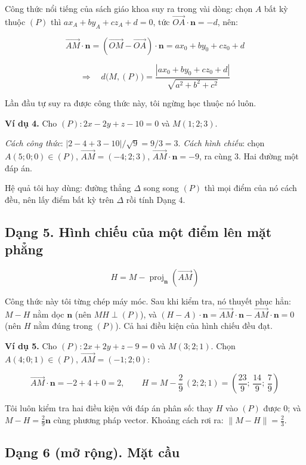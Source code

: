 \documentclass[12pt,a4paper]{article}
\begin{document}
Công thức nổi tiếng của sách giáo khoa suy ra trong vài dòng: chọn $A$ bất kỳ thuộc $(P)$ thì $ax_A+by_A+cz_A+d=0$, tức $\overrightarrow{OA}\cdot\mathbf{n}=-d$, nên:

$$
\overrightarrow{AM}\cdot\mathbf{n}
= (\overrightarrow{OM}-\overrightarrow{OA})\cdot\mathbf{n}
= ax_0+by_0+cz_0+d
$$

$$
\Longrightarrow\quad
d\bigl(M,(P)\bigr) = \frac{|ax_0 + by_0 + cz_0 + d|}{\sqrt{a^2+b^2+c^2}}
$$

Lần đầu tự suy ra được công thức này, tôi ngừng học thuộc nó luôn.

\textbf{Ví dụ 4.} Cho $(P): 2x-2y+z-10=0$ và $M(1;2;3)$.

\emph{Cách công thức}: $|2-4+3-10|/\sqrt{9} = 9/3 = 3$. \emph{Cách hình chiếu}: chọn $A(5;0;0)\in(P)$, $\overrightarrow{AM}=(-4;2;3)$, $\overrightarrow{AM}\cdot\mathbf{n} = -9$, ra cùng $3$. Hai đường một đáp án.

Hệ quả tôi hay dùng: đường thẳng $\Delta$ song song $(P)$ thì mọi điểm của nó cách đều, nên lấy điểm bất kỳ trên $\Delta$ rồi tính Dạng 4.

\subsection*{Dạng 5. Hình chiếu của một điểm lên mặt phẳng}

$$
\boxed{\;H = M - \operatorname{proj}_{\mathbf{n}}(\overrightarrow{AM})\;}
$$

Công thức này tôi từng chép máy móc. Sau khi kiểm tra, nó thuyết phục hẳn: $M-H$ nằm dọc $\mathbf{n}$ (nên $MH \perp (P)$), và $(H-A)\cdot\mathbf{n} = \overrightarrow{AM}\cdot\mathbf{n} - \overrightarrow{AM}\cdot\mathbf{n} = 0$ (nên $H$ nằm đúng trong $(P)$). Cả hai điều kiện của hình chiếu đều đạt.

\textbf{Ví dụ 5.} Cho $(P): 2x+2y+z-9=0$ và $M(3;2;1)$. Chọn $A(4;0;1)\in(P)$, $\overrightarrow{AM}=(-1;2;0)$:

$$
\overrightarrow{AM}\cdot\mathbf{n} = -2+4+0 = 2,
\qquad
H = M - \frac{2}{9}\,(2;2;1) = \left(\frac{23}{9};\,\frac{14}{9};\,\frac{7}{9}\right)
$$

Tôi luôn kiểm tra hai điều kiện với đáp án phân số: thay $H$ vào $(P)$ được $0$; và $M-H = \frac{2}{9}\mathbf{n}$ cùng phương pháp vector. Khoảng cách rơi ra: $\|M-H\| = \frac{2}{3}$.

\subsection*{Dạng 6 (mở rộng). Mặt cầu}
\end{document}
